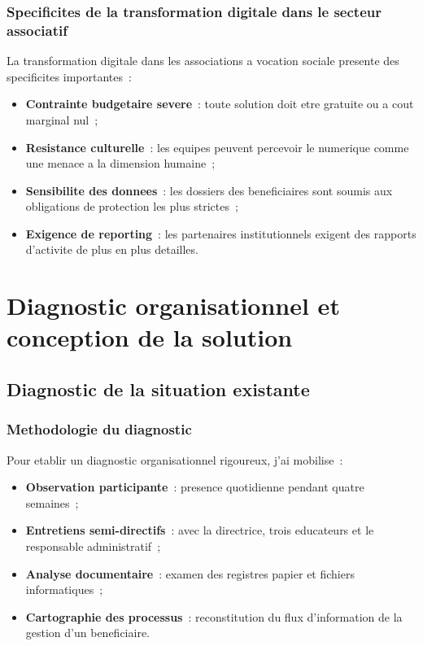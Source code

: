 \documentclass[12pt,a4paper,openany]{report}
\begin{document}
\section{Specificites de la transformation digitale dans le secteur associatif}

La transformation digitale dans les associations a vocation sociale presente
des specificites importantes~:

\begin{itemize}
  \item \textbf{Contrainte budgetaire severe}~: toute solution doit etre
    gratuite ou a cout marginal nul~;
  \item \textbf{Resistance culturelle}~: les equipes peuvent percevoir le
    numerique comme une menace a la dimension humaine~;
  \item \textbf{Sensibilite des donnees}~: les dossiers des beneficiaires
    sont soumis aux obligations de protection les plus strictes~;
  \item \textbf{Exigence de reporting}~: les partenaires institutionnels
    exigent des rapports d'activite de plus en plus detailles.
\end{itemize}

\part{Diagnostic organisationnel et conception de la solution}

\chapter{Diagnostic de la situation existante}

\section{Methodologie du diagnostic}

Pour etablir un diagnostic organisationnel rigoureux, j'ai mobilise~:

\begin{itemize}
  \item \textbf{Observation participante}~: presence quotidienne pendant
    quatre semaines~;
  \item \textbf{Entretiens semi-directifs}~: avec la directrice, trois
    educateurs et le responsable administratif~;
  \item \textbf{Analyse documentaire}~: examen des registres papier et
    fichiers informatiques~;
  \item \textbf{Cartographie des processus}~: reconstitution du flux
    d'information de la gestion d'un beneficiaire.
\end{itemize}
\end{document}
